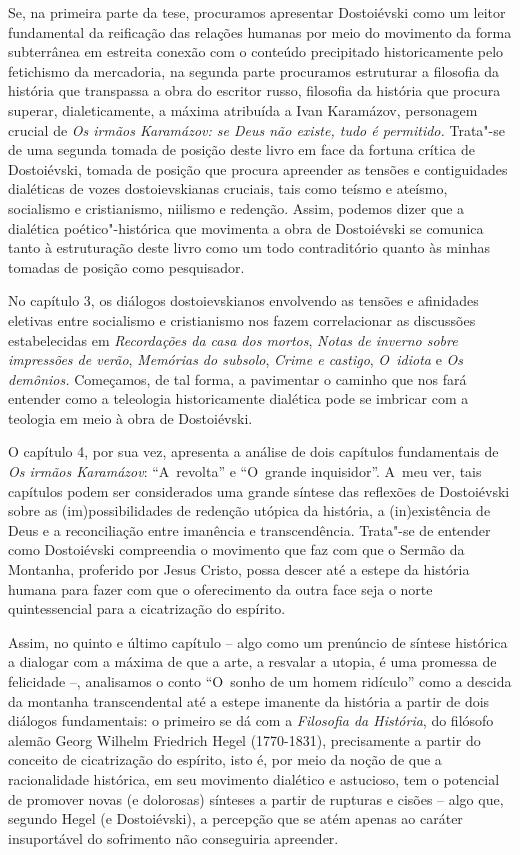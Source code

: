 {Se, na primeira parte da tese, procuramos apresentar Dostoiévski como um
leitor fundamental da reificação das relações humanas por meio do
movimento da forma subterrânea em estreita conexão com o conteúdo
precipitado historicamente pelo fetichismo da mercadoria, na segunda
parte procuramos estruturar a filosofia da história que transpassa a
obra do escritor russo, filosofia da história que procura superar,
dialeticamente, a máxima atribuída a Ivan Karamázov, personagem crucial
de \emph{Os irmãos Karamázov: se Deus não existe, tudo é permitido.}
Trata"-se de uma segunda tomada de posição deste livro em face da fortuna
crítica de Dostoiévski, tomada de posição que procura apreender as
tensões e contiguidades dialéticas de vozes dostoievskianas cruciais,
tais como teísmo e ateísmo, socialismo e cristianismo, niilismo e
redenção. Assim, podemos dizer que a dialética poético"-histórica que
movimenta a obra de Dostoiévski se comunica tanto à estruturação deste
livro como um todo contraditório quanto às minhas tomadas de posição
como pesquisador.

No capítulo 3, os diálogos dostoievskianos envolvendo as tensões e
afinidades eletivas entre socialismo e cristianismo nos fazem
correlacionar as discussões estabelecidas em \emph{Recordações da casa
dos mortos}, \emph{Notas de inverno sobre impressões de verão},
\emph{Memórias do subsolo}, \emph{Crime e castigo}, \emph{O~idiota} e
\emph{Os demônios.} Começamos, de tal forma, a pavimentar o caminho que
nos fará entender como a teleologia historicamente dialética pode se
imbricar com a teologia em meio à obra de Dostoiévski.

O capítulo 4, por sua vez, apresenta a análise de dois capítulos
fundamentais de \emph{Os irmãos Karamázov}: ``A~revolta'' e ``O~grande
inquisidor''. A~meu ver, tais capítulos podem ser considerados uma
grande síntese das reflexões de Dostoiévski sobre as (im)possibilidades
de redenção utópica da história, a (in)existência de Deus e a
reconciliação entre imanência e transcendência. Trata"-se de entender
como Dostoiévski compreendia o movimento que faz com que o Sermão da
Montanha, proferido por Jesus Cristo, possa descer até a estepe da
história humana para fazer com que o oferecimento da outra face seja o
norte quintessencial para a cicatrização do espírito.

Assim, no quinto e último capítulo -- algo como um prenúncio de síntese
histórica a dialogar com a máxima de que a arte, a resvalar a utopia, é
uma promessa de felicidade --, analisamos o conto ``O~sonho de um homem
ridículo'' como a descida da montanha transcendental até a estepe
imanente da história a partir de dois diálogos fundamentais: o primeiro
se dá com a \emph{Filosofia da História}, do filósofo alemão Georg
Wilhelm Friedrich Hegel (1770-1831), precisamente a partir do conceito
de cicatrização do espírito, isto é, por meio da noção de que a
racionalidade histórica, em seu movimento dialético e astucioso, tem o
potencial de promover novas (e dolorosas) sínteses a partir de rupturas
e cisões -- algo que, segundo Hegel (e Dostoiévski), a percepção que se
atém apenas ao caráter insuportável do sofrimento não conseguiria
apreender.

}
